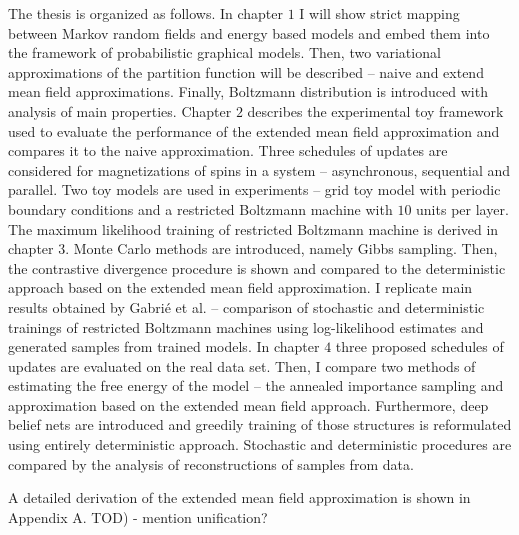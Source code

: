 The thesis is organized as follows. In chapter $1$ I will show strict mapping between Markov random fields and energy based models and embed them into the framework of probabilistic graphical models. Then, two variational approximations of the partition function will be described -- naive and extend mean field approximations. Finally, Boltzmann distribution is introduced with analysis of main properties. Chapter $2$ describes the experimental toy framework used to evaluate the performance of the extended mean field approximation and compares it to the naive approximation. Three schedules of updates are considered for magnetizations of spins in a system -- asynchronous, sequential and parallel. Two toy models are used in experiments -- grid toy model with periodic boundary conditions and a restricted Boltzmann machine with $10$ units per layer. 
The maximum likelihood training of restricted Boltzmann machine is derived in chapter $3$. Monte Carlo methods are introduced, namely Gibbs sampling. Then, the contrastive divergence procedure is shown and compared to the deterministic approach based on the extended mean field approximation. I replicate main results obtained by Gabri\'e et al. -- comparison of stochastic and deterministic trainings of restricted Boltzmann machines using log-likelihood estimates and generated samples from trained models.
In chapter $4$ three proposed schedules of updates are evaluated on the real data set. Then, I compare two methods of estimating the free energy of the model -- the annealed importance sampling and approximation based on the extended mean field approach.
Furthermore, deep belief nets are introduced and greedily training of those structures is reformulated using entirely deterministic approach. Stochastic and deterministic procedures are compared by the analysis of reconstructions of samples from data.

A detailed derivation of the extended mean field approximation is shown in Appendix A.
TOD) - mention unification?